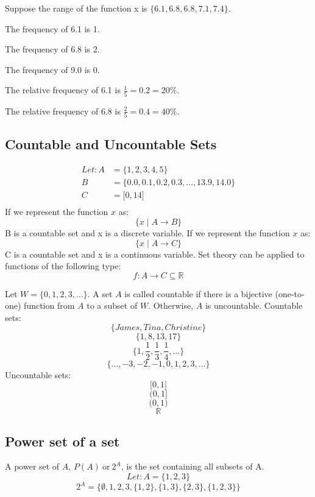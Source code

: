 \documentclass[letterpaper, 12pt]{article}
\begin{document}
Suppose the range of the function x is
\( \big\{ 6.1, 6.8, 6.8, 7.1, 7.4 \big\} \).

The frequency of 6.1 is 1. \par
The frequency of 6.8 is 2. \par
The frequency of 9.0 is 0. \par
The relative frequency of 6.1 is \( \frac{1}{5} = 0.2 = 20\% \). \par
The relative frequency of 6.8 is \( \frac{2}{5} = 0.4 = 40\% \).

\begin{center}
\end{center}

\subsection{Countable and Uncountable Sets}
\begin{align*}
  Let: A &= \bigg\{ 1, 2, 3, 4, 5 \bigg\} \\
  B &= \bigg\{ 0.0, 0.1, 0.2, 0.3, \dots, 13.9, 14.0 \bigg\} \\
  C &= \bigg[ 0, 14 \bigg] \\
\end{align*}
If we represent the function \( x \) as:
\[ \bigg\{ x \mid A \to B \bigg\} \]
B is a countable set and x is a discrete variable.
If we represent the function \( x \) as:
\[ \bigg\{ x \mid A \to C \bigg\} \]
C is a countable set and x is a continuous variable.
Set theory can be applied to functions of the following type:
\[ f:A \to C \subseteq \mathbb{R} \]

Let \( W = \big\{ 0, 1, 2, 3, \dots \big\} \). A set \( A \) is called
countable if there is a bijective (one-to-one) function from \( A \) to a
subset of \( W \). Otherwise, \( A \) is uncountable.
Countable sets:
\[ \bigg\{ James, Tina, Christine \bigg\} \]
\[ \bigg\{ 1, 8, 13, 17 \bigg\} \]
\[ \bigg\{ 1, \frac{1}{2}, \frac{1}{3}, \frac{1}{4}, \dots \bigg\} \]
\[ \bigg\{ \dots, -3, -2, -1, 0, 1, 2, 3, \dots \bigg\} \]
Uncountable sets:
\[ \bigg[ 0, 1 \bigg] \]
\[ \bigg( 0, 1 \bigg] \]
\[ \bigg( 0, 1 \bigg) \]
\[ \mathbb{R} \]

\subsection{Power set of a set}
A power set of \( A \), \( P(A) \mathrm{\ or\ } 2^{A} \), is the set containing
all subsets of A.
\[ Let: A = \bigg\{ 1, 2, 3 \bigg\} \]
\[ 2^{A} = \bigg\{ \emptyset, 1, 2, 3, \{1, 2\}, \{1, 3\}, \{2, 3\},
   \{1, 2, 3\} \bigg\} \]
\end{document}
